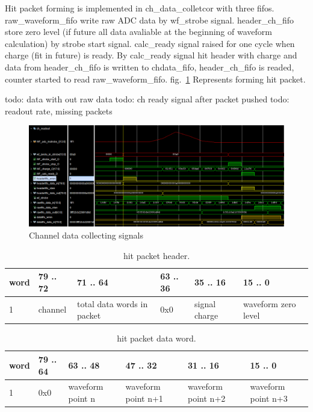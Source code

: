 \documentclass{article}
\begin{document}
Hit packet forming is implemented in ch\_data\_colletcor with three fifos. raw\_waveform\_fifo write raw ADC data by wf\_strobe signal. header\_ch\_fifo store zero level (if future all data avaliable at the beginning of waveform calculation) by strobe start signal. calc\_ready signal raised for one cycle when charge (fit in future) is ready. By calc\_ready signal hit header with charge and data from header\_ch\_fifo is written to chdata\_fifo, header\_ch\_fifo is readed, counter started to read raw\_waveform\_fifo. fig.~\ref{fig:2} Represents forming hit packet.

todo: data with out raw data
todo: ch ready signal after packet pushed
todo: readout rate, missing packets

\begin{figure}[H]
	\centering 
	\includegraphics[width=1.0\textwidth]{ADC_ch_data_collector_wave.png}
	\caption{\label{fig:2} Channel data collecting signals}
\end{figure}





\begin{table}[H]
\centering
\begin{tabular}{| l | l | l | l | l | l |}
\hline
word & 79 .. 72 & 71 .. 64 & 63 .. 36 & 35 .. 16 & 15 .. 0 \\ \hline
1 & channel & total data words in packet& 0x0 & signal charge & waveform zero level \\ \hline
\end{tabular}
\caption{hit packet header.\label{tab1}}
\end{table}

\begin{table}[H]
\centering
\begin{tabular}{| l | l | l | l | l | l |}
\hline
word & 79 .. 64 & 63 .. 48 & 47 .. 32 & 31 .. 16 & 15 .. 0 \\ \hline
1 & 0x0 & waveform point n & waveform point n+1 & waveform point n+2 & waveform point n+3 \\ \hline
\end{tabular}
\caption{hit packet data word.\label{tab2}}
\end{table}
\end{document}
